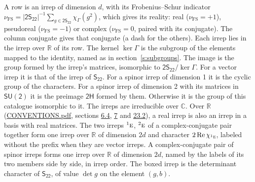 \documentclass[10pt,a4paper]{article}
\numberwithin{equation}{section}
\newcommand{\grp}[1]{\mathsf{#1}}
\newcommand{\irr}[1]{\text{\normalfont\scshape #1}}
\newcommand{\conjpair}[1]{{}^{#1}}
\newcommand{\irchar}[1]{\chi_{#1}}
\newcommand{\fsind}{\nu_{\mathrm{FS}}}
\begin{document}
\leavevmode\label{n:index.frobenius}\label{n:head.irrep}\label{n:head.reality}A row is an irrep of dimension $d$, with its Frobenius--Schur indicator $\fsind = |\grp{2S_{22}}|^{-1}\allowbreak\sum_{g\in\grp{2S_{22}}}\irchar{\Gamma}(g^2)$, which gives its reality: real ($\fsind = +1$), pseudoreal ($\fsind = -1$) or complex ($\fsind = 0$, paired with its conjugate). \label{n:head.conjugate}The column conjugate gives that conjugate (a dash for the others). \label{n:head.over.real}Each irrep lies in the irrep over $\mathbb{R}$ of its row. \label{n:head.kernel}The kernel $\ker\Gamma$ is the subgroup of the elements mapped to the identity, named as in section~\ref{s:subgroups}. \label{n:head.image}The image is the group formed by the irrep's matrices, isomorphic to $\grp{2S_{22}}/\ker\Gamma$. For a vector irrep it is that of the irrep of \href{../../../rotation/data/pdf/S22.pdf}{$\grp{S_{22}}$}. For a spinor irrep of dimension 1 it is the cyclic group of the characters. For a spinor irrep of dimension 2 with its matrices in $\grp{SU(2)}$ it is the preimage $\grp{2H}$ formed by them. Otherwise it is the group of this catalogue isomorphic to it. The irreps are irreducible over $\mathbb{C}$. Over $\mathbb{R}$ (\href{../../CONVENTIONS.pdf}{CONVENTIONS.pdf}, sections \href{../../../rotation/CONVENTIONS.pdf\#conv.6.4}{6.4}, \href{../../../rotation/CONVENTIONS.pdf\#conv.7}{7} and \href{../../CONVENTIONS.pdf\#conv.23.2}{23.2}), a real irrep is also an irrep in a basis with real matrices. The two irreps $\conjpair{1}\irr{e}$, $\conjpair{2}\irr{e}$ of a complex-conjugate pair together form one irrep over $\mathbb{R}$ of dimension $2d$ and character $2\operatorname{Re}\irchar{\conjpair{1}\irr{e}}$, labeled without the prefix when they are vector irreps. A complex-conjugate pair of spinor irreps forms one irrep over $\mathbb{R}$ of dimension $2d$, named by the labels of its two members side by side, in irrep order. \label{n:mark.determinant}The boxed irrep is the determinant character of \href{../../../rotation/data/pdf/S22.pdf}{$\grp{S_{22}}$}, of value $\det g$ on the element $(g, b)$.
\setlength{\emergencystretch}{2em}\par\setlength{\emergencystretch}{0pt}
\end{document}
